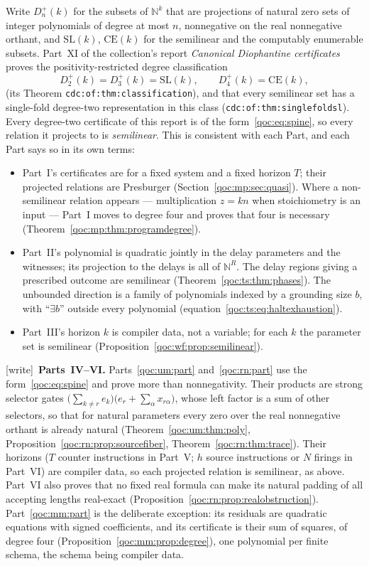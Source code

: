 \documentclass[11pt,letterpaper]{article}
\theoremstyle{definition}
\theoremstyle{remark}
\newcommand{\N}{\mathbb N}
\newcommand{\wtag}{\textup{[write]}}
\newcommand{\lab}[1]{\nolinkurl{#1}}
\newcommand{\Dplus}{D^{+}}
\begin{document}
Write $\Dplus_n(k)$ for the subsets of $\N^k$ that are projections of natural zero sets of integer polynomials of degree at most $n$, nonnegative on the real nonnegative orthant, and $\mathrm{SL}(k)$, $\mathrm{CE}(k)$ for the semilinear and the computably enumerable subsets. Part~XI of the collection's report \emph{Canonical Diophantine certificates} proves the positivity-restricted degree classification
\[
 \Dplus_2(k)=\Dplus_3(k)=\mathrm{SL}(k),\qquad \Dplus_4(k)=\mathrm{CE}(k),
\]
(its Theorem \lab{cdc:of:thm:classification}), and that every semilinear set has a single-fold degree-two representation in this class (\lab{cdc:of:thm:singlefoldsl}). Every degree-two certificate of this report is of the form~\eqref{qoc:eq:spine}, so every relation it projects to is \emph{semilinear}. This is consistent with each Part, and each Part says so in its own terms:
\begin{itemize}
\item Part~I's certificates are for a fixed system and a fixed horizon $T$; their projected relations are Presburger (Section~\ref{qoc:mp:sec:quasi}). Where a non-semilinear relation appears --- multiplication $z=kn$ when stoichiometry is an input --- Part~I moves to degree four and proves that four is necessary (Theorem~\ref{qoc:mp:thm:programdegree}).
\item Part~II's polynomial is quadratic jointly in the delay parameters and the witnesses; its projection to the delays is all of $\N^R$. The delay regions giving a prescribed outcome are semilinear (Theorem~\ref{qoc:ts:thm:phases}). The unbounded direction is a family of polynomials indexed by a grounding size $b$, with ``$\exists b$'' outside every polynomial (equation~\eqref{qoc:ts:eq:haltexhaustion}).
\item Part~III's horizon $k$ is compiler data, not a variable; for each $k$ the parameter set is semilinear (Proposition~\ref{qoc:wf:prop:semilinear}).
\end{itemize}

\wtag\ \textbf{Parts~IV--VI.} Parts~\ref{qoc:um:part} and~\ref{qoc:rn:part} use the form~\eqref{qoc:eq:spine} and prove more than nonnegativity. Their products are strong selector gates $\bigl(\sum_{k\ne r}e_k\bigr)\bigl(e_r+\sum_\alpha x_{r\alpha}\bigr)$, whose left factor is a sum of other selectors, so that for natural parameters every zero over the real nonnegative orthant is already natural (Theorem~\ref{qoc:um:thm:poly}, Proposition~\ref{qoc:rn:prop:sourcefiber}, Theorem~\ref{qoc:rn:thm:trace}). Their horizons ($T$ counter instructions in Part~V; $h$ source instructions or $N$ firings in Part~VI) are compiler data, so each projected relation is semilinear, as above. Part~VI also proves that no fixed real formula can make its natural padding of all accepting lengths real-exact (Proposition~\ref{qoc:rn:prop:realobstruction}). Part~\ref{qoc:mm:part} is the deliberate exception: its residuals are quadratic equations with signed coefficients, and its certificate is their sum of squares, of degree four (Proposition~\ref{qoc:mm:prop:degree}), one polynomial per finite schema, the schema being compiler data.
\end{document}
